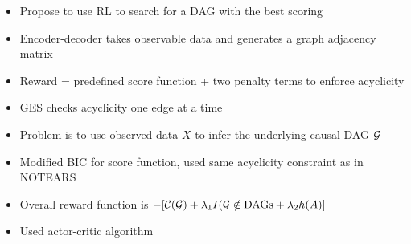 \begin{itemize}
  \item Propose to use RL to search for a DAG with the best scoring
  \item Encoder-decoder takes observable data and generates a graph adjacency matrix
  \item Reward = predefined score function + two penalty terms to enforce acyclicity
  \item GES checks acyclicity one edge at a time
  \item Problem is to use observed data $X$ to infer the underlying causal DAG $\mathcal{G}$
  \item Modified BIC for score function, used same acyclicity constraint as in NOTEARS
  \item Overall reward function is $-[\mathcal{C}(\mathcal{G}) + \lambda_{1} I(\mathcal{G} \notin \text{DAGs} + \lambda_{2}h(A)]$
  \item Used actor-critic algorithm
\end{itemize}